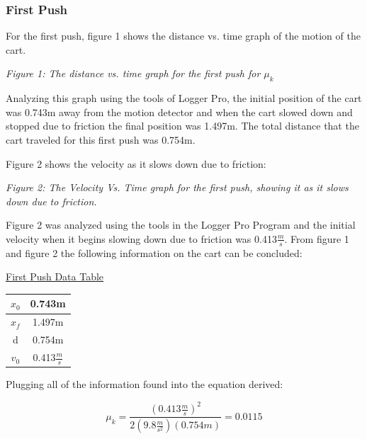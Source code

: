 \documentclass[aps,letterpaper,11pt]{revtex4}
\begin{document}
\subsubsection{First Push}

For the first push, figure 1 shows the distance vs. time graph of the motion of the cart. 

\newpage

\begin{center}

\textit{Figure 1: The distance vs. time graph for the first push for $\mu_k$}\\
\end{center}

Analyzing this graph using the tools of Logger Pro, the initial position of the cart was 0.743m away from the motion detector and when the cart slowed down and stopped due to friction the final position was 1.497m. The total distance that the cart traveled for this first push was 0.754m.

Figure 2 shows the velocity as it slows down due to friction:

\newpage

\begin{center}

\textit{Figure 2: The Velocity Vs. Time graph for the first push, showing it as it slows down due to friction.}\\
\end{center}

Figure 2 was analyzed using the tools in the Logger Pro Program and the initial velocity when it begins slowing down due to friction was 0.413$\frac{m}{s}$. From figure 1 and figure 2 the following information on the cart can be concluded:

\begin{center}
\underline{First Push Data Table}\\
\begin{tabular}{|c|c|}
\hline
$x_0$ & 0.743m \\
\hline
$x_f$ & 1.497m \\
\hline
d & 0.754m\\
\hline
$v_0$ & 0.413$\frac{m}{s}$\\
\hline
\end{tabular}
\end{center}

Plugging all of the information found into the equation derived:

$$ \mu_k=\frac{(0.413\frac{m}{s})^2}{2(9.8\frac{m}{s^2})(0.754m)} = 0.0115$$
\end{document}
